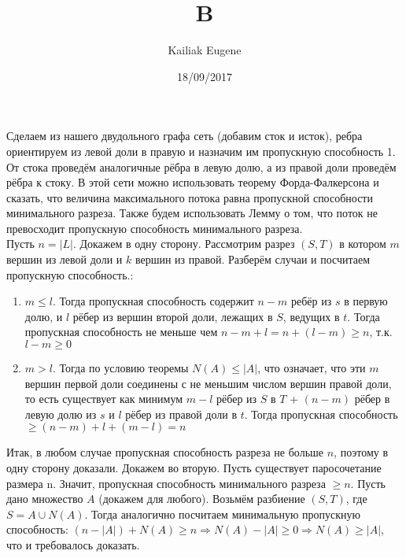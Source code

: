 \documentclass[12pt]{article}
\title{B}
\date{18/09/2017}
\author{Kailiak Eugene}
\begin{document}
\maketitle
Сделаем из нашего двудольного графа сеть (добавим сток и исток), ребра ориентируем из левой доли в правую и назначим им пропускную способность 1. От стока проведём аналогичные рёбра в левую долю, а из правой доли проведём рёбра к стоку. В этой сети можно использовать теорему Форда-Фалкерсона и сказать, что величина максимального потока равна пропускной способности минимального разреза. Также будем использовать Лемму о том, что поток не превосходит пропускную способность минимального разреза. \\
Пусть $n = |L|$. Докажем в одну сторону. Рассмотрим разрез $(S,T)$ в котором $m$ вершин из левой доли и $k$ вершин из правой. Разберём случаи и посчитаем пропускную способность.: 
	\begin{enumerate}
\item $m \leq l$. Тогда пропускная способность содержит $n-m$ ребёр из $s$ в первую долю, и $l$ рёбер из вершин второй доли, лежащих в $S$, ведущих в $t$. Тогда пропускная способность не меньше чем $n - m + l = n + (l - m) \geq n$, т.к. $l - m \geq 0$
\item $m > l$. Тогда по условию теоремы $N(A) \leq |A|$, что означает, что эти $m$ вершин первой доли соединены с не меньшим числом вершин правой доли, то есть существует как минимум $m - l$ рёбер из $S$ в $T$ + $(n-m)$ рёбер в левую долю из $s$ и $l$ рёбер из правой доли в $t$. Тогда пропускная способность $\geq (n-m) + l + (m-l) = n$ 
\end{enumerate}
Итак, в любом случае пропускная способность разреза не больше $n$, поэтому в одну сторону доказали.
Докажем во вторую. Пусть существует паросочетание размера n. Значит, пропускная способность минимального разреза $\geq n$. Пусть дано множество $A$ (докажем для любого). Возьмём разбиение $(S,T)$, где $S = A \cup N(A)$. Тогда аналогично посчитаем минимальную пропускную способность: $(n - |A|)  + N(A) \geq n \Rightarrow N(A) - |A| \geq 0 \Rightarrow N(A) \geq |A| $, что и требовалось доказать.
	
\end{document}
